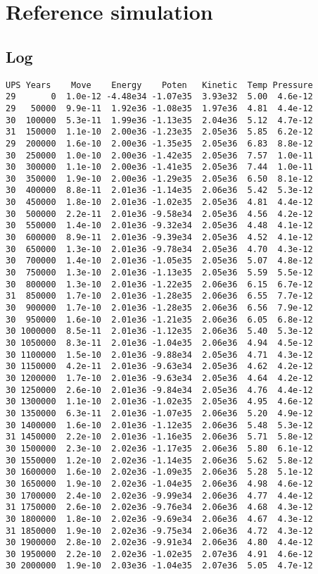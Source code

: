 \documentclass[../main.tex]{subfiles}
\begin{document}
\section{Reference simulation}

\subsection{Log}
\singlespacing
\begin{verbatim}
UPS Years    Move    Energy    Poten   Kinetic  Temp Pressure
29       0  1.0e-12 -4.48e34 -1.07e35  3.93e32  5.00  4.6e-12
29   50000  9.9e-11  1.92e36 -1.08e35  1.97e36  4.81  4.4e-12
30  100000  5.3e-11  1.99e36 -1.13e35  2.04e36  5.12  4.7e-12
31  150000  1.1e-10  2.00e36 -1.23e35  2.05e36  5.85  6.2e-12
29  200000  1.6e-10  2.00e36 -1.35e35  2.05e36  6.83  8.8e-12
30  250000  1.0e-10  2.00e36 -1.42e35  2.05e36  7.57  1.0e-11
30  300000  1.1e-10  2.00e36 -1.41e35  2.05e36  7.44  1.0e-11
30  350000  1.9e-10  2.00e36 -1.29e35  2.05e36  6.50  8.1e-12
30  400000  8.8e-11  2.01e36 -1.14e35  2.06e36  5.42  5.3e-12
30  450000  1.8e-10  2.01e36 -1.02e35  2.05e36  4.81  4.4e-12
30  500000  2.2e-11  2.01e36 -9.58e34  2.05e36  4.56  4.2e-12
30  550000  1.4e-10  2.01e36 -9.32e34  2.05e36  4.48  4.1e-12
30  600000  8.9e-11  2.01e36 -9.39e34  2.05e36  4.52  4.1e-12
30  650000  1.3e-10  2.01e36 -9.78e34  2.05e36  4.70  4.3e-12
30  700000  1.4e-10  2.01e36 -1.05e35  2.05e36  5.07  4.8e-12
30  750000  1.3e-10  2.01e36 -1.13e35  2.05e36  5.59  5.5e-12
30  800000  1.3e-10  2.01e36 -1.22e35  2.06e36  6.15  6.7e-12
31  850000  1.7e-10  2.01e36 -1.28e35  2.06e36  6.55  7.7e-12
30  900000  1.7e-10  2.01e36 -1.28e35  2.06e36  6.56  7.9e-12
30  950000  1.6e-10  2.01e36 -1.21e35  2.06e36  6.05  6.8e-12
30 1000000  8.5e-11  2.01e36 -1.12e35  2.06e36  5.40  5.3e-12
30 1050000  8.3e-11  2.01e36 -1.04e35  2.06e36  4.94  4.5e-12
30 1100000  1.5e-10  2.01e36 -9.88e34  2.05e36  4.71  4.3e-12
30 1150000  4.2e-11  2.01e36 -9.63e34  2.05e36  4.62  4.2e-12
30 1200000  1.7e-10  2.01e36 -9.63e34  2.05e36  4.64  4.2e-12
30 1250000  2.6e-10  2.01e36 -9.84e34  2.05e36  4.76  4.4e-12
30 1300000  1.1e-10  2.01e36 -1.02e35  2.05e36  4.95  4.6e-12
30 1350000  6.3e-11  2.01e36 -1.07e35  2.06e36  5.20  4.9e-12
30 1400000  1.6e-10  2.01e36 -1.12e35  2.06e36  5.48  5.3e-12
31 1450000  2.2e-10  2.01e36 -1.16e35  2.06e36  5.71  5.8e-12
30 1500000  2.3e-10  2.02e36 -1.17e35  2.06e36  5.80  6.1e-12
30 1550000  1.2e-10  2.02e36 -1.14e35  2.06e36  5.62  5.8e-12
30 1600000  1.6e-10  2.02e36 -1.09e35  2.06e36  5.28  5.1e-12
30 1650000  1.9e-10  2.02e36 -1.04e35  2.06e36  4.98  4.6e-12
30 1700000  2.4e-10  2.02e36 -9.99e34  2.06e36  4.77  4.4e-12
31 1750000  2.6e-10  2.02e36 -9.76e34  2.06e36  4.68  4.3e-12
30 1800000  1.8e-10  2.02e36 -9.69e34  2.06e36  4.67  4.3e-12
31 1850000  1.9e-10  2.02e36 -9.75e34  2.06e36  4.72  4.3e-12
30 1900000  2.8e-10  2.02e36 -9.91e34  2.06e36  4.80  4.4e-12
30 1950000  2.2e-10  2.02e36 -1.02e35  2.07e36  4.91  4.6e-12
30 2000000  1.9e-10  2.03e36 -1.04e35  2.07e36  5.05  4.7e-12
\end{verbatim}
\onehalfspacing
\end{document}

